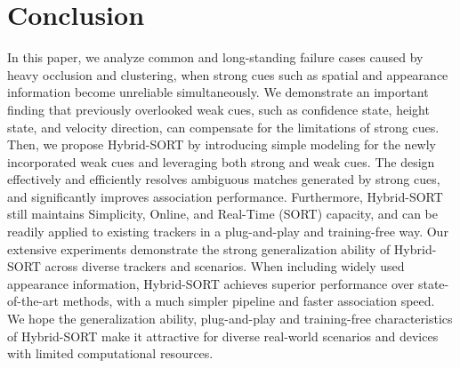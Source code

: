 \documentclass[letterpaper]{article} \usepackage{aaai23}  \usepackage{times}  \usepackage{helvet}  \usepackage{courier}  \usepackage[hyphens]{url}  \usepackage{graphicx} \urlstyle{rm} \def\UrlFont{\rm}  \usepackage{natbib}  \usepackage{caption} \frenchspacing  \setlength{\pdfpagewidth}{8.5in}  \setlength{\pdfpageheight}{11in}  \usepackage{algorithm}
\begin{document}
\section{Conclusion}
In this paper, we analyze common and long-standing failure cases caused by heavy occlusion and clustering, when strong cues such as spatial and appearance information become unreliable simultaneously. We demonstrate an important finding that previously overlooked weak cues, such as confidence state, height state, and velocity direction, can compensate for the limitations of strong cues. Then, we propose Hybrid-SORT by introducing simple modeling for the newly incorporated weak cues and leveraging both strong and weak cues. The design effectively and efficiently resolves ambiguous matches generated by strong cues, and significantly improves association performance. Furthermore, Hybrid-SORT still maintains Simplicity, Online, and Real-Time (SORT) capacity, and can be readily applied to
existing trackers in a plug-and-play and training-free way. Our extensive experiments demonstrate the strong generalization ability of Hybrid-SORT across diverse trackers and scenarios. When including widely used appearance information, Hybrid-SORT achieves superior performance over state-of-the-art methods, with a much simpler pipeline and faster association speed. We hope the generalization ability, plug-and-play and training-free characteristics of Hybrid-SORT make it attractive for diverse real-world scenarios and devices with limited computational resources.



\end{document}
